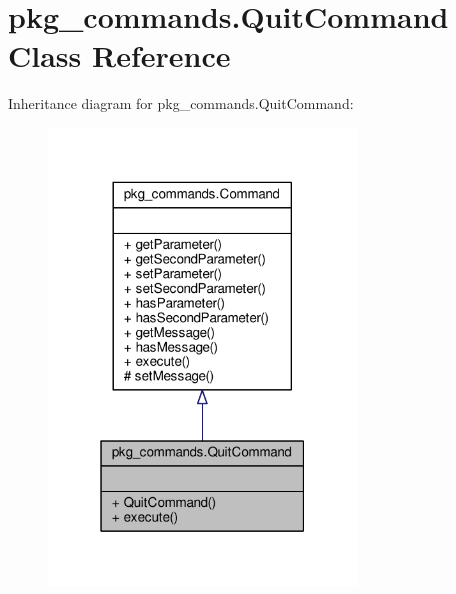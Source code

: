 \hypertarget{classpkg__commands_1_1QuitCommand}{\section{pkg\-\_\-commands.\-Quit\-Command Class Reference}
\label{classpkg__commands_1_1QuitCommand}
}


Inheritance diagram for pkg\-\_\-commands.\-Quit\-Command\-:
\nopagebreak
\begin{figure}[H]
\begin{center}
\leavevmode
\includegraphics[width=232pt]{classpkg__commands_1_1QuitCommand__inherit__graph}
\end{center}
\end{figure}


